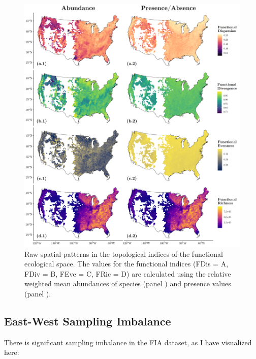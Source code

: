 \documentclass[
  10pt,
]{article}
\begin{document}
\begin{figure}[!h]
  \centering
  \includegraphics[width=\textwidth]{../Final Visualizations/realMap.png}
  \caption{Raw spatial patterns in the topological indices of the functional ecological space. The values for the functional indices (FDis = A\*, FDiv = B\*, FEve = C\*, FRic = D\*) are calculated using the relative weighted mean abundances of species (panel ) and presence values (panel ).}
  \label{fig:rawMaps}
\end{figure}

\newpage

\hypertarget{appendixSampling}{%
\subsection{East-West Sampling Imbalance}\label{appendixSampling}}

There is significant sampling imbalance in the FIA dataset, as I have visualized here:
\end{document}
